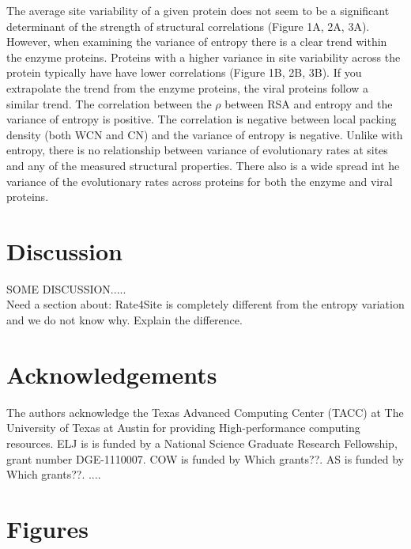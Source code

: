 \documentclass[12pt]{article}
\begin{document}
\indent  The average site variability of a given protein does not seem to be a significant determinant of the strength of structural correlations (Figure 1A, 2A, 3A). However, when examining the variance of entropy there is a clear trend within the enzyme proteins.  Proteins with a higher variance in site variability across the protein typically have have lower correlations (Figure 1B, 2B, 3B). If you extrapolate the trend from the enzyme proteins, the viral proteins follow a similar trend. The correlation between the $\rho$ between RSA and entropy and the variance of entropy is positive. The correlation is negative between local packing density (both WCN and CN) and the variance of entropy is negative. Unlike with entropy, there is no relationship between variance of evolutionary rates at sites and any of the measured structural properties. There also is a wide spread int he variance of the evolutionary rates across proteins for both the enzyme and viral proteins. 


\section{Discussion}
\label{sec:dcr}
{\color{red}SOME DISCUSSION.....} \\

Need a section about:
Rate4Site is completely different from the entropy variation and we do not know why. Explain the difference. 

\section{Acknowledgements}
The authors acknowledge the Texas Advanced Computing Center (TACC) at The University of Texas at Austin for providing High-performance computing resources. ELJ is is funded by a National Science Graduate Research Fellowship, grant number DGE-1110007. COW is funded by {\color{red} Which grants??}.  AS is funded by {\color{red} Which grants??}.
....




\cleardoublepage
\section*{Figures}
\end{document}
